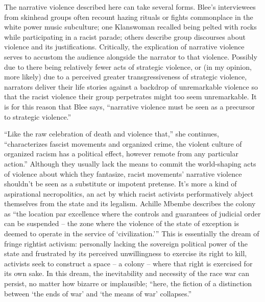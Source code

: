 \documentclass[11pt]{article}
\begin{document}
The narrative violence described here can take several forms. Blee's interviewees from skinhead groups often recount hazing rituals or fights commonplace in the white power music subculture; one Klanswoman recalled being pelted with rocks while participating in a racist parade; others describe group discourses about violence and its justifications. Critically, the explication of narrative violence serves to accustom the audience alongside the narrator to that violence. Possibly due to there being relatively fewer acts of strategic violence, or (in my opinion, more likely) due to a perceived greater transgressiveness of strategic violence, narrators deliver their life stories against a backdrop of unremarkable violence so that the racist violence their group perpetrates might too seem unremarkable. It is for this reason that Blee says, ``narrative violence must be seen as a precursor to strategic violence.''

``Like the raw celebration of death and violence that,'' she continues, ``characterizes fascist movements and organized crime, the violent culture of organized racism has a political effect, however remote from any particular action.''\autocite[186]{Bl02} Although they usually lack the means to commit the world-shaping acts of violence about which they fantasize, racist movements' narrative violence shouldn't be seen as a substitute or impotent pretense. It's more a kind of aspirational necropolitics, an act by which racist activists performatively abject themselves from the state and its legalism. Achille Mbembe describes the colony as ``the location par excellence where the controls and guarantees of judicial order can be suspended -- the zone where the violence of the state of exception is deemed to operate in the service of `civilization.'''\autocite[24]{Mb03} This is essentially the dream of fringe rightist activism: personally lacking the sovereign political power of the state and frustrated by its perceived unwillingness to exercise its right to kill, activists seek to construct a space -- a colony -- where that right is exercised for its own sake. In this dream, the inevitability and necessity of the race war can persist, no matter how bizarre or implausible; ``here, the fiction of a distinction between `the ends of war' and `the means of war' collapses.''\autocite[25]{Mb03}


\end{document}

